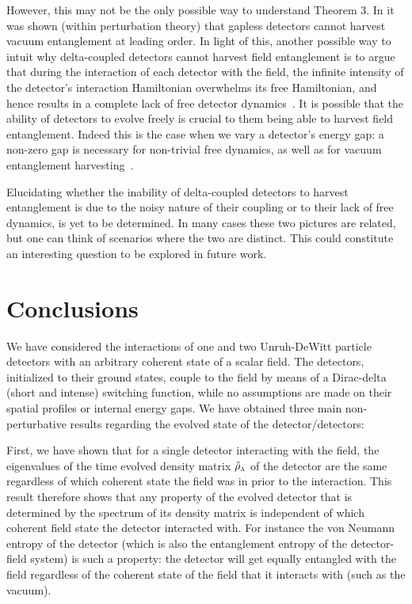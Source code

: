 \documentclass[pra,nofootinbib,floats,aps,twocolumn,tightenlines,superscriptaddress]{revtex4-1}
\newcommand{\rhoa}{\hat{\rho}_\textsc{a}}
\begin{document}
However, this may not be the only possible way to understand Theorem 3. In \cite{Pozas2017} it was shown (within perturbation theory) that gapless detectors cannot harvest vacuum entanglement at leading order. In light of this, another possible way to intuit why delta-coupled detectors cannot harvest field entanglement is to argue that during the interaction of each detector with the field, the infinite intensity of the detector's interaction Hamiltonian overwhelms its free Hamiltonian, and hence results in a complete lack of free detector dynamics~\cite{Pozas2017}. It is possible that the ability of detectors to evolve freely is crucial to them being able to harvest field entanglement. Indeed this is the case when we vary a detector's energy gap: a non-zero gap is necessary for non-trivial free dynamics, as well as for vacuum entanglement harvesting~\cite{Pozas2017}. 

Elucidating whether the inability of delta-coupled detectors to harvest entanglement is due to the noisy nature of their coupling or to their lack of free dynamics, is yet to be determined. In many cases these two pictures are related, but one can think of scenarios where the two are distinct. This could constitute an interesting question to be explored in future work.







\section{Conclusions}
\label{sec:conclusions}

We have considered the interactions of one and two Unruh-DeWitt particle detectors with an arbitrary coherent state of a scalar field. The detectors, initialized to their ground states, couple to the field by means of a Dirac-delta (short and intense) switching function, while no assumptions are made on their spatial profiles or internal energy gaps. We have obtained three main non-perturbative results regarding the evolved state of the detector/detectors:

First, we have shown that for a single detector interacting with the field, the eigenvalues of the time evolved density matrix $\rhoa$ of the detector are the same regardless of which coherent state the field was in prior to the interaction. This result therefore shows that any property of the evolved detector that is determined by the spectrum of its density matrix is independent of which coherent field state the detector interacted with. For instance the von Neumann entropy of the detector (which is also the entanglement entropy of the detector-field system) is such a property: the detector will get equally entangled with the field regardless of the coherent state of the field that it interacts with (such as the vacuum).
\end{document}
